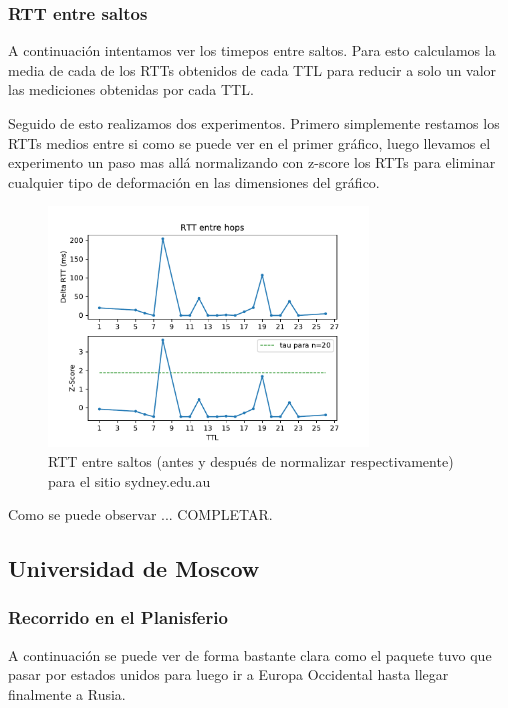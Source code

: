 \subsubsection*{RTT entre saltos}

A continuación intentamos ver los timepos entre saltos. Para esto calculamos la media de cada de los RTTs obtenidos de cada TTL para reducir a solo un valor las mediciones obtenidas por cada TTL. 

Seguido de esto realizamos dos experimentos. Primero simplemente restamos los RTTs medios entre si como se puede ver en el primer gráfico, luego llevamos el experimento un paso mas allá normalizando con z-score los RTTs para eliminar cualquier tipo de deformación en las dimensiones del gráfico.

\begin{figure}[H]
  \centering
  \includegraphics[width=8.5cm]{figs/traceroute-sidney.pdf}
  \caption{\normalfont RTT entre saltos (antes y después de normalizar respectivamente) para el sitio sydney.edu.au}
\end{figure}

Como se puede observar ... COMPLETAR.


\subsection*{Universidad de Moscow}

\subsubsection*{Recorrido en el Planisferio}

A continuación se puede ver de forma bastante clara como el paquete tuvo que pasar por estados unidos para luego ir a Europa Occidental hasta llegar finalmente a Rusia.

